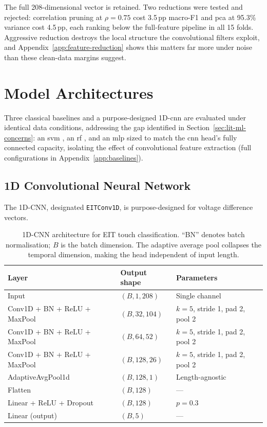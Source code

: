 The full 208-dimensional vector is retained. Two reductions were tested and rejected: correlation pruning at $\rho = 0.75$ cost 3.5\,pp macro-F1 and \gls{pca} at 95.3\% variance cost 4.5\,pp, each ranking below the full-feature pipeline in all 15 folds. Aggressive reduction destroys the local structure the convolutional filters exploit, and Appendix~\ref{app:feature-reduction} shows this matters far more under noise than these clean-data margins suggest.

\section{Model Architectures}
\label{sec:method-models}

Three classical baselines and a purpose-designed 1D-\gls{cnn} are evaluated under identical data conditions, addressing the gap identified in Section~\ref{sec:lit-ml-concerns}: an \gls{svm} \parencite{cortes1995}, an \gls{rf} \parencite{breiman2001}, and an \gls{mlp} sized to match the \gls{cnn} head's fully connected capacity, isolating the effect of convolutional feature extraction (full configurations in Appendix~\ref{app:baselines}).

\subsection{1D Convolutional Neural Network}
\label{sec:method-cnn}

The 1D-CNN, designated \texttt{EITConv1D}, is purpose-designed for voltage difference vectors.

\begin{table}[htbp]
\centering
\caption[1D-CNN architecture]{1D-CNN architecture for EIT touch classification. ``BN'' denotes batch normalisation; $B$ is the batch dimension. The adaptive average pool collapses the temporal dimension, making the head independent of input length.}
\label{tab:cnn-architecture}
\small
\begin{tabularx}{\textwidth}{@{}l l X@{}}
\toprule
\textbf{Layer} & \textbf{Output shape} & \textbf{Parameters} \\
\midrule
Input                            & $(B, 1, 208)$   & Single channel \\
Conv1D + BN + ReLU + MaxPool     & $(B, 32, 104)$  & $k=5$, stride 1, pad 2, pool 2 \\
Conv1D + BN + ReLU + MaxPool     & $(B, 64, 52)$   & $k=5$, stride 1, pad 2, pool 2 \\
Conv1D + BN + ReLU + MaxPool     & $(B, 128, 26)$  & $k=5$, stride 1, pad 2, pool 2 \\
AdaptiveAvgPool1d                & $(B, 128, 1)$   & Length-agnostic \\
Flatten                          & $(B, 128)$      & --- \\
Linear + ReLU + Dropout          & $(B, 128)$      & $p=0.3$ \\
Linear (output)                  & $(B, 5)$        & --- \\
\bottomrule
\end{tabularx}
\end{table}



